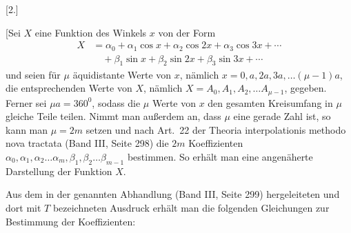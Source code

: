\clearpage
\begin{landscape}
\begingroup
\fontsize{9.5}{12}\selectfont
{}
\renewcommand{\headrulewidth}{0pt}
\makeatletter\tagsleft@true\let\veqno\@@leqno\makeatother
\setlength{\lineskip}{4pt}\setlength{\lineskiplimit}{4pt}
\begin{center}[2.]\end{center}
\newcommand{\VtwoLowPoint}{\makebox[0pt][l]{\kern-.05em\raisebox{-.4ex}{\rule{.065em}{.065em}}}}
\newcommand{\VtwoMarkedSin}{\mathop{\mathrm{sin}\text{\llap{\raisebox{-.6ex}{\rule{.06em}{.06em}}\kern.1em}}}}
\newcommand{\VtwoMarkedL}{\mathord{L\text{\rlap{\kern.06em\raisebox{1.2ex}{\rule{.06em}{.06em}}}}}}
\newcommand{\VtwoLeader}{\mathord{.}\,\mathord{.}\,\mathord{.}\,\mathord{.}\,\mathord{.}\,\mathord{.}\,\mathord{.}\,\mathord{.}\,\mathord{.}\,\mathord{.}\,\mathord{.}\,\mathord{.}\,\mathord{.}\,\mathord{.}\,\mathord{.}\,\mathord{.}\,\mathord{.}\,\mathord{.}\,\mathord{.}\,\mathord{.}\,\mathord{.}\,\mathord{.}\,\mathord{.}\,\mathord{.}\,\mathord{.}}
\par\noindent\hspace*{\parindent}[Sei \(X\) eine Funktion des Winkels \(x\) von der Form
\[
\begin{aligned} X &= \alpha_0 + \alpha_1\cos x + \alpha_2\cos 2x + \alpha_3\cos 3x + \cdots \\ &\quad + \beta_1\sin x + \beta_2\sin 2x + \beta_3\sin 3x + \cdots \end{aligned}
\]
und seien für \(\mu\) äquidistante Werte von \(x\), nämlich \(x=0, a, 2a, 3a, \ldots (\mu-1)a\), die entsprechenden Werte von \(X\), nämlich \(X = A_0, A_1, A_2, \ldots A_{\mu-1}\), gegeben. Ferner sei \(\mu a = 360^{0}\), sodass die \(\mu\) Werte von \(x\) den gesamten Kreisumfang in \(\mu\) gleiche Teile teilen. Nimmt man außerdem an, dass \(\mu\) eine gerade Zahl ist, so kann man \(\mu = 2m\) setzen und nach Art.\ 22 der Theoria interpolationis methodo nova tractata (Band III, Seite 298) die \(2m\) Koeffizienten \(\alpha_0, \alpha_1, \alpha_2 \ldots \alpha_m, \beta_1, \beta_2 \ldots \beta_{m-1}\) bestimmen. So erhält man eine angenäherte Darstellung der Funktion \(X\).
\par\noindent\hspace*{\parindent}Aus dem in der genannten Abhandlung (Band III, Seite 299) hergeleiteten und dort mit \(T\) bezeichneten Ausdruck erhält man die folgenden Gleichungen zur Bestimmung der Koeffizienten:

\end{landscape}
